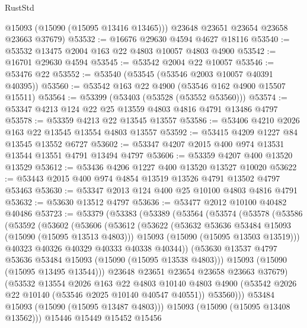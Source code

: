 \begin{lexlean}{RustStd}
\begin{coremodule}
        @15093
        (@15090 (@15095 @13416 @13465)))
      @23648
      @23651
      @23654
      @23658
      @23663
      @37679)
@53532 := @16676 @29630 @4594 @4627 @18116
@53540 := @53532 @13475 @2004 @163 @22 @4803 @10057 @4803 @4900
@53542 := @16701 @29630 @4594
@53545 := @53542 @2004 @22 @10057
@53546 := @53476 @22
@53552 := @53540 (@53545 (@53546 @2003 @10057 @40391 @40395))
@53560 := @53542 @163 @22 @4900 (@53546 @162 @4900 @15507 @15511)
@53564 := @53399 (@53403 (@53528 (@53552 @53560)))
@53574 := @53347 @4213 @124 @22 @25 @13559 @4803 @4816 @4791 @13486 @4797
@53578 := @53359 @4213 @22 @13545 @13557
@53586 := @53406 @4210 @2026 @163 @22 @13545 @13554 @4803 @13557
@53592 := @53415 @4209 @1227 @84 @13545 @13552 @6727
@53602 := @53347 @4207 @2015 @400 @974 @13531 @13544 @13551 @4791 @13494 @4797
@53606 := @53359 @4207 @400 @13520 @13529
@53612 := @53436 @4206 @1227 @400 @13520 @13527 @10020
@53622 := @53443 @2015 @400 @974 @4854 @13519 @13526 @4791 @13502 @4797 @53463
@53630 := @53347 @2013 @124 @400 @25 @10100 @4803 @4816 @4791
@53632 := @53630 @13512 @4797
@53636 := @53477 @2012 @10100 @40482 @40486
@53723 := @53379
    (@53383
      (@53389
        (@53564
          (@53574
            (@53578
              (@53586
                (@53592
                  (@53602
                    (@53606
                      (@53612
                        (@53622
                          (@53632 @53636 @53484 @15093 (@15090 (@15095 @13513 @4803)))
                          @15093
                          (@15090 (@15095 @13503 @13519)))
                        @40323
                        @40326
                        @40329
                        @40333
                        @40338
                        @40344))
                    (@53630 @13537 @4797 @53636 @53484 @15093 (@15090 (@15095 @13538 @4803)))
                    @15093
                    (@15090 (@15095 @13495 @13544)))
                  @23648
                  @23651
                  @23654
                  @23658
                  @23663
                  @37679)
                (@53532
                  @13554
                  @2026
                  @163
                  @22
                  @4803
                  @10140
                  @4803
                  @4900
                  (@53542 @2026 @22 @10140 (@53546 @2025 @10140 @40547 @40551))
                  @53560)))
            @53484
            @15093
            (@15090 (@15095 @13487 @4803)))
          @15093
          (@15090 (@15095 @13408 @13562)))
        @15446
        @15449
        @15452
        @15456

\end{coremodule}
\end{lexlean}
